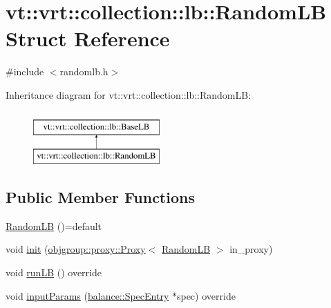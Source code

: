 \hypertarget{structvt_1_1vrt_1_1collection_1_1lb_1_1_random_l_b}{}\section{vt\+:\+:vrt\+:\+:collection\+:\+:lb\+:\+:Random\+LB Struct Reference}
\label{structvt_1_1vrt_1_1collection_1_1lb_1_1_random_l_b}


{\ttfamily \#include $<$randomlb.\+h$>$}

Inheritance diagram for vt\+:\+:vrt\+:\+:collection\+:\+:lb\+:\+:Random\+LB\+:\begin{figure}[H]
\begin{center}
\leavevmode
\includegraphics[height=2.000000cm]{structvt_1_1vrt_1_1collection_1_1lb_1_1_random_l_b}
\end{center}
\end{figure}
\subsection*{Public Member Functions}
\begin{DoxyCompactItemize}
\item 
\hyperlink{structvt_1_1vrt_1_1collection_1_1lb_1_1_random_l_b_ac6bf4ed6fb55fb787478c5f00d68f20c}{Random\+LB} ()=default
\item 
void \hyperlink{structvt_1_1vrt_1_1collection_1_1lb_1_1_random_l_b_a1b9a24043e9a971fc3acb47233028ca8}{init} (\hyperlink{structvt_1_1objgroup_1_1proxy_1_1_proxy}{objgroup\+::proxy\+::\+Proxy}$<$ \hyperlink{structvt_1_1vrt_1_1collection_1_1lb_1_1_random_l_b}{Random\+LB} $>$ in\+\_\+proxy)
\item 
void \hyperlink{structvt_1_1vrt_1_1collection_1_1lb_1_1_random_l_b_a7354965590d0ab010841a2a9086ce7e8}{run\+LB} () override
\item 
void \hyperlink{structvt_1_1vrt_1_1collection_1_1lb_1_1_random_l_b_ae0269a00daa9a3111742d9ea35f5a542}{input\+Params} (\hyperlink{structvt_1_1vrt_1_1collection_1_1balance_1_1_spec_entry}{balance\+::\+Spec\+Entry} $\ast$spec) override
\end{DoxyCompactItemize}
